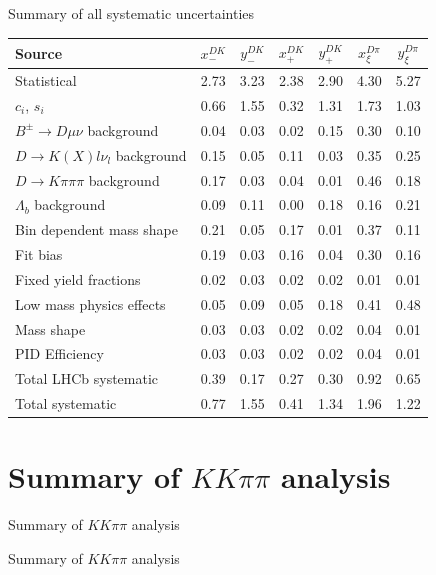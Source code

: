 \documentclass{beamer}
\begin{document}
\begin{frame}{Summary of all systematic uncertainties}
  \begin{tabular}{lcccccc} 
        \hline
        Source & $x_-^{DK}$ & $y_-^{DK}$ & $x_+^{DK}$ & $y_+^{DK}$ & $x_\xi^{D\pi}$ & $y_\xi^{D\pi}$ \\
        \hline
        Statistical                              & 2.73  & 3.23  & 2.38  & 2.90  & 4.30  & 5.27  \\
        \hline
        $c_i$, $s_i$                             & 0.66  & 1.55  & 0.32  & 1.31  & 1.73  & 1.03  \\
        \hline
        $B^\pm\to D\mu\nu$ background            & 0.04  & 0.03  & 0.02  & 0.15  & 0.30  & 0.10 \\
        $D\to K(X)l\nu_l$ background             & 0.15  & 0.05  & 0.11  & 0.03  & 0.35  & 0.25 \\
        $D\to K\pi\pi\pi$ background             & 0.17  & 0.03  & 0.04  & 0.01  & 0.46  & 0.18 \\
        $\Lambda_b$ background                   & 0.09  & 0.11  & 0.00  & 0.18  & 0.16  & 0.21 \\
        Bin dependent mass shape                 & 0.21  & 0.05  & 0.17  & 0.01  & 0.37  & 0.11 \\
        Fit bias                                 & 0.19  & 0.03  & 0.16  & 0.04  & 0.30  & 0.16 \\
        Fixed yield fractions                    & 0.02  & 0.03  & 0.02  & 0.02  & 0.01  & 0.01 \\
        Low mass physics effects                 & 0.05  & 0.09  & 0.05  & 0.18  & 0.41  & 0.48 \\
        Mass shape                               & 0.03  & 0.03  & 0.02  & 0.02  & 0.04  & 0.01 \\
        PID Efficiency                           & 0.03  & 0.03  & 0.02  & 0.02  & 0.04  & 0.01 \\
        \hline
        Total LHCb systematic                    & 0.39  & 0.17  & 0.27  & 0.30  & 0.92  & 0.65  \\
        \hline
        Total systematic                         & 0.77  & 1.55  & 0.41  & 1.34  & 1.96  & 1.22  \\
        \hline
  \end{tabular}
\end{frame}

\section{Summary of $KK\pi\pi$ analysis}
\begin{frame}{Summary of $KK\pi\pi$ analysis}
  \begin{center}
    {\huge Summary of $KK\pi\pi$ analysis}
  \end{center}
\end{frame}
\end{document}
